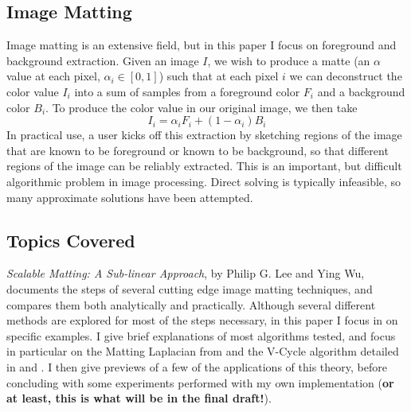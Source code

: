 \subsection{Image Matting}
Image matting is an extensive field, but in this paper I focus on foreground and background extraction. Given an image $I$, we wish to produce a matte (an $\alpha$ value at each pixel, $\alpha_{i}\in[0,1]$) such that at each pixel $i$ we can deconstruct the color value $I_{i}$ into a sum of samples from a foreground color $F_{i}$ and a background color $B_{i}$. To produce the color value in our original image, we then take
\[I_{i}=\alpha_{i}F_{i}+(1-\alpha_{i})B_{i}\]
In practical use, a user kicks off this extraction by sketching regions of the image that are known to be foreground or known to be background, so that different regions of the image can be reliably extracted. This is an important, but difficult algorithmic problem in image processing. Direct solving is typically infeasible, so many approximate solutions have been attempted.
\subsection{Topics Covered}
\textit{Scalable Matting: A Sub-linear Approach}, by Philip G. Lee and Ying Wu, documents the steps of several cutting edge image matting techniques, and compares them both analytically and practically. Although several different methods are explored for most of the steps necessary, in this paper I focus in on specific examples. I give brief explanations of most algorithms tested, and focus in particular on the Matting Laplacian from \cite{levin08} and the V-Cycle algorithm detailed in \cite{briggs87} and \cite{bramble93}. I then give previews of a few of the applications of this theory, before concluding with some experiments performed with my own implementation (\textbf{or at least, this is what will be in the final draft!}).